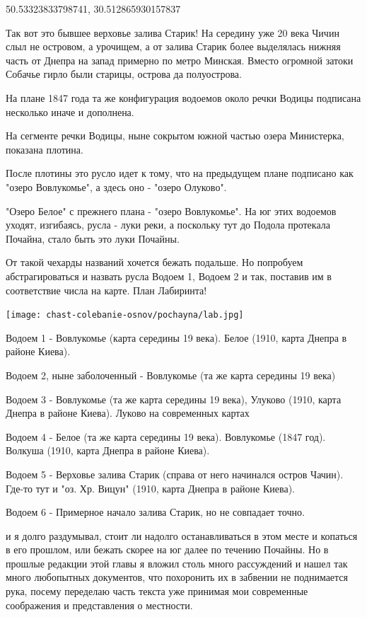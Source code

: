 50.53323833798741, 30.512865930157837 

Так вот это бывшее верховье залива Старик!
На середину уже 20 века Чичин слыл не островом, а урочищем, а от залива Старик более выделялась нижняя часть от Днепра на запад примерно по метро Минская. Вместо огромной затоки Собачье гирло были старицы, острова да полуострова.

На плане 1847 года та же конфигурация водоемов около речки Водицы подписана несколько иначе и дополнена. 

На сегменте речки Водицы, ныне сокрытом южной частью озера Министерка, показана плотина.

После плотины это русло идет к тому, что на предыдущем плане подписано как "озеро Вовлукомье", а здесь оно - "озеро Олуково".

"Озеро Белое" с прежнего плана - "озеро Вовлукомье". На юг этих водоемов уходят, изгибаясь, русла - луки реки, а поскольку тут до Подола протекала Почайна, стало быть это луки Почайны.

От такой чехарды названий хочется бежать подальше. Но попробуем абстрагироваться и назвать русла Водоем 1, Водоем 2 и так, поставив им в соответствие числа на карте. План  Лабиринта!

\begin{center}
\texttt{[image: chast-colebanie-osnov/pochayna/lab.jpg]}
\end{center}

Водоем 1 - Вовлукомье (карта середины 19 века). Белое (1910, карта Днепра в районе Киева).

Водоем 2, ныне заболоченный - Вовлукомье (та же карта середины 19 века)

Водоем 3 - Вовлукомье (та же карта середины 19 века), Улуково (1910, карта Днепра в районе Киева). Луково на современных картах

Водоем 4 - Белое (та же карта середины 19 века). Вовлукомье (1847 год). Волкуша (1910, карта Днепра в районе Киева).

Водоем 5 - Верховье залива Старик (справа от него начинался остров Чачин). Где-то тут и "оз. Хр. Вицун" (1910, карта Днепра в районе Киева).

Водоем 6 - Примерное начало залива Старик, но не совпадает точно. 

 и я долго раздумывал, стоит ли надолго останавливаться в этом месте и копаться в его прошлом, или бежать скорее на юг далее по течению Почайны. Но в прошлые редакции этой главы я вложил столь много рассуждений и нашел так много любопытных документов, что похоронить их в забвении не поднимается рука, посему переделаю часть текста уже принимая мои современные соображения и представления о местности. 

